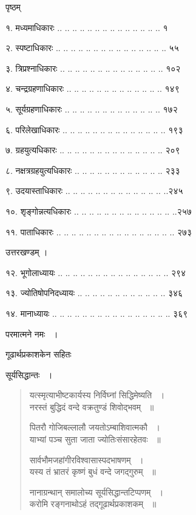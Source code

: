 \documentclass[11pt, openany]{book}
\begin{document}
\hfill पृष्ठम् 

 १. मध्यमाधिकारः .. .. .. .. .. .. .. .. .. .. .. .. .. .. \hfill १
 
२. स्पष्टाधिकारः .. .. .. .. .. .. .. .. .. .. .. .. .. .. .. \hfill ५५

३. त्रिप्रश्नाधिकारः .. .. .. .. .. .. .. .. .. .. .. .. .. ..  \hfill १०२

४. चन्द्रग्रहणाधिकारः .. .. .. .. .. .. .. .. .. .. .. .. ..  \hfill १४९

५. सूर्यग्रहणाधिकारः .. .. .. .. ..  .. .. .. .. .. .. .. .. \hfill १७२

६. परिलेखाधिकारः .. .. .. .. .. .. .. .. .. .. .. .. .. .. \hfill १९३

७. ग्रहयुत्यधिकारः .. .. .. .. .. .. .. .. .. .. .. .. .. .. \hfill २०९

८. नक्षत्रग्रहयुत्यधिकारः .. .. .. .. .. .. .. .. .. .. .. ..  \hfill २३३

९. उदयास्ताधिकारः .. .. .. .. .. .. .. .. .. .. .. ..  .. ..\hfill २४५


१०. शृङ्गोन्नत्यधिकारः .. .. .. .. .. .. .. .. .. .. .. .. .. ..\hfill २५७

११. पाताधिकारः .. .. .. .. .. .. .. .. .. .. .. .. .. .. .. .. \hfill २७३ 

\begin{center}

 उत्तरखण्डम् । 
\end{center}


१२. भूगोलाध्यायः .. .. .. .. .. .. .. .. .. .. .. .. .. .. .. \hfill २९४

१३. ज्योतिषोपनिदध्यायः .. .. .. .. .. .. .. .. .. .. .. .. \hfill ३४६

१४. मानाध्यायः .. .. .. .. .. .. .. .. .. .. .. .. .. .. .. .. \hfill ३६९ 

 
\newpage


\begin{center}
 परमात्मने नमः ~।
 \vspace{3mm}
 
गूढार्थप्रकाशकेन सहितः
\vspace{3mm}

सूर्यसिद्धान्तः ~।
\end{center}
\begin{quote}

{\ssi  यत्स्मृत्याभीष्टकार्यस्य निर्विघ्नां सिद्धिमेष्यति ~।\\
नरस्तं बुद्धिदं वन्दे वक्रतुण्डं शिवोद्भवम् ~॥

पितरौ गोजिबल्लालौ जयतोऽम्बाशिवात्मकौ ~।\\
याभ्यां पञ्च सुता जाता ज्योतिःसंसारहेतवः ~॥

सार्वभौमजहांगीरविश्वासास्पदभाषणम् ~।\\
यस्य तं भ्रातरं कृष्णं बुधं वन्दे जगद्गुरुम् ~॥

नानाग्रन्थान् समालोच्य सूर्यसिद्धान्तटिप्पणम् ~।\\
करोमि रङ्गनाथोऽहं तद्गूढार्थप्रकाशकम् ~॥}
\end{quote}
\end{document}

